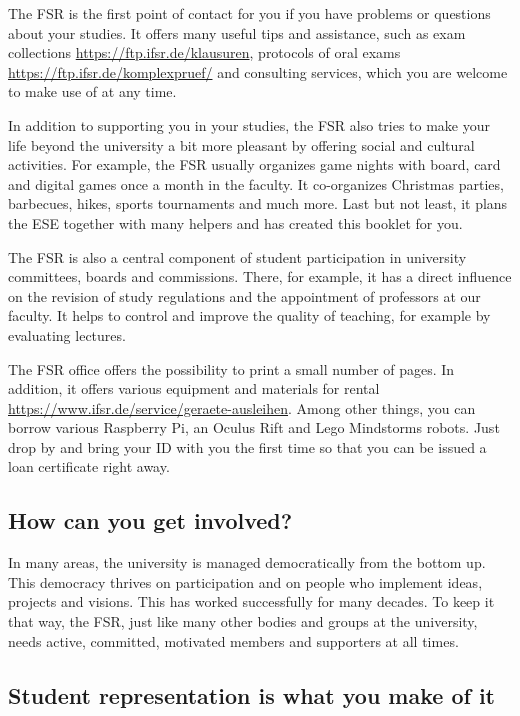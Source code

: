 The FSR is the first point of contact for you if you have problems or questions about your studies.
It offers many useful tips and assistance, such as exam collections \url{https://ftp.ifsr.de/klausuren},
protocols of oral exams \url{https://ftp.ifsr.de/komplexpruef/} 
and consulting services, which you are welcome to make use of at any time.

In addition to supporting you in your studies, the FSR also tries to make your life beyond the university a bit more pleasant by offering social and cultural activities.
For example, the FSR usually organizes game nights with board, card and digital games once a month in the faculty.
It co-organizes Christmas parties, barbecues, hikes, sports tournaments and much more.
Last but not least, it plans the ESE together with many helpers and has created this booklet for you.

The FSR is also a central component of student participation in university committees, boards and commissions. There, for example, it has a direct influence on the revision of study regulations and the appointment of professors at our faculty. It helps to control and improve the quality of teaching, for example by evaluating lectures.

The FSR office offers the possibility to print a small number of pages. In addition, it offers various equipment and materials for rental
\url{https://www.ifsr.de/service/geraete-ausleihen}.
Among other things, you can borrow various Raspberry Pi, an Oculus Rift and Lego Mindstorms robots. 
Just drop by and bring your ID with you the first time so that you can be issued a loan certificate right away.

\subsection*{How can you get involved?} 

In many areas, the university is managed democratically from the bottom up.
This democracy thrives on participation and on people who implement ideas, projects and visions.
This has worked successfully for many decades.
To keep it that way, the FSR, just like many other bodies and groups at the university, needs active, committed, motivated members and supporters at all times.

\subsection*{Student representation is what you make of it}


